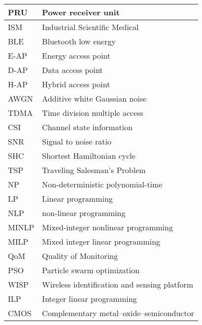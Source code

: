 \documentclass[twocolumn,10pt]{IEEEtran}
\begin{document}
\begin{table}
\begin{tabular}{|l|l|}
\hline
PRU & Power receiver unit \\
\hline
ISM & Industrial Scientific Medical \\
\hline
BLE & Bluetooth low energy \\
\hline
E-AP & Energy access point\\
\hline
D-AP & Data access point \\
\hline
H-AP & Hybrid access point \\
\hline
AWGN & Additive white Gaussian noise \\
\hline
TDMA & Time division multiple access   \\
\hline
CSI   & Channel state information \\
\hline
SNR & Signal to noise ratio \\
\hline
SHC & Shortest Hamiltonian cycle \\
\hline 
TSP & Traveling Salesman's Problem\\
\hline
NP & Non-deterministic polynomial-time \\
\hline
LP  & Linear programming  \\
\hline
NLP & non-linear programming \\
\hline
MINLP & Mixed-integer nonlinear programming \\
\hline
MILP & Mixed integer linear programming  \\
\hline
QoM & Quality of Monitoring \\
\hline
PSO & Particle swarm optimization \\ 
\hline
WISP & Wireless identification and sensing platform \\
\hline
ILP & Integer linear programming  \\
\hline
CMOS & Complementary metal–oxide–semiconductor \\
\hline














\end{tabular}
\end{table}
\end{document}
